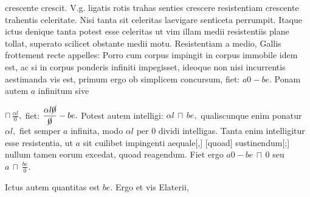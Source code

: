  crescente crescit.
V.g.  ligatis rotis trahas
senties crescere resistentiam crescente trahentis celeritate.
Nisi tanta sit celeritas\protect{}
laevigare 
senticeta perrumpit.
Itaque ictus denique tanta potest esse celeritas
ut vim\protect{}
illam medii resistentiis plane tollat,
superato scilicet obstante medii motu.
Resistentiam a medio,\protect{}
Gallis frottement\protect{} recte appelles:%
\protect{}
\pend
\count{}
\count{}
\count{}
\pstart
Porro cum corpus impingit in corpus immobile
idem est, ac si in corpus ponderis infiniti impegisset,
ideoque non nisi incurrentis aestimanda vis est,
primum ergo ob simplicem concursum, fiet:
$\displaystyle a0 - be.$
Ponam autem $\displaystyle a$ infinitum
sive \rule[-4mm]{0mm}{10mm}$\displaystyle \sqcap\, \frac{\alpha l}{0},$
fiet: $\displaystyle \frac{\alpha l \cancel{0}}{\cancel{0}} - be.$
Potest autem intelligi:
$\displaystyle \alpha l\, \sqcap\, be,$
qualiscunque enim ponatur $\displaystyle \alpha l,$
fiet semper $\displaystyle a$ infinita,
modo $\displaystyle \alpha l$ per $\displaystyle 0$ dividi intelligas.
Tanta enim intelligitur esse resistentia,
ut $\displaystyle a$ sit cuilibet impingenti aequale[,]
[quoad]
sustinendum[;]
nullum tamen eorum excedat,
quoad reagendum.
Fiet ergo
$\displaystyle a0 - be\, \sqcap\, 0$
seu $\displaystyle a\, \sqcap\, \frac{be}{0}.$\protect\rule[-4mm]{0mm}{10mm}
Ictus autem quantitas\protect{} est $\displaystyle be.$
Ergo et vis Elaterii,\protect{}
